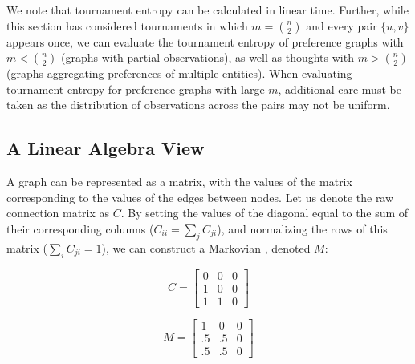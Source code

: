 We note that tournament entropy can be calculated in linear time.
Further, while this section has considered tournaments in which $m = {n\choose{2}}$ and every pair $\{u, v\}$ appears once, we can evaluate the tournament entropy of preference graphs with $m < {n\choose{2}}$ (graphs with partial observations), as well as thoughts with $m > {n\choose{2}}$ (graphs aggregating preferences of multiple entities).
When evaluating tournament entropy for preference graphs with large $m$, additional care must be taken as the distribution of observations across the pairs may not be uniform.

\subsection{A Linear Algebra View}

A graph can be represented as a matrix, with the values of the matrix corresponding to the values of the edges between nodes.
Let us denote the raw connection matrix as $C$.
By setting the values of the diagonal equal to the sum of their corresponding columns ($C_{ii} = \sum_j C_{ji}$), and normalizing the rows of this matrix ($\sum_i C_{ji} = 1$), we can construct a Markovian , denoted $M$:

\begin{center}
\begin{minipage}{1.2in}
\end{minipage}
\hfill
\begin{minipage}{1.2in}
\[
C=
  \begin{bmatrix}
    0 & 0 & 0 \\
    1 & 0 & 0 \\
    1 & 1 & 0
  \end{bmatrix}
\]
\end{minipage}
\hfill
\begin{minipage}{1.2in}
\[
M=
  \begin{bmatrix}
    1 & 0 & 0 \\
    .5 & .5 & 0 \\
    .5 & .5 & 0
  \end{bmatrix}
\]
\end{minipage}
\hfill
\end{center}



